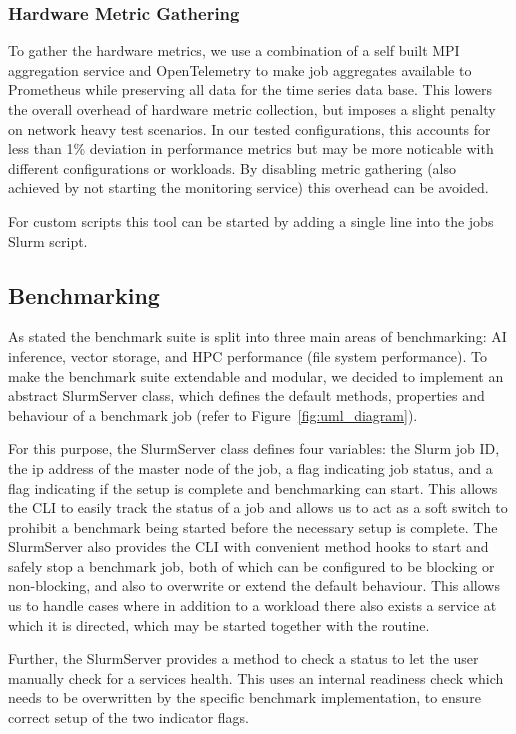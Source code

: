 \documentclass[conference,12pt]{IEEEtran}
\begin{document}
    \subsubsection{Hardware Metric Gathering}

    To gather the hardware metrics, we use a combination of a self built MPI aggregation service and OpenTelemetry to make job aggregates available to Prometheus while preserving all data for the time series data base.
    This lowers the overall overhead of hardware metric collection, but imposes a slight penalty on network heavy test scenarios.
    In our tested configurations, this accounts for less than 1\% deviation in performance metrics but may be more noticable with different configurations or workloads.
    By disabling metric gathering (also achieved by not starting the monitoring service) this overhead can be avoided.

    For custom scripts this tool can be started by adding a single line into the jobs Slurm script.

    

    \subsection{Benchmarking}
    As stated the benchmark suite is split into three main areas of benchmarking: AI inference, vector storage, and HPC performance (file system performance).
    To make the benchmark suite extendable and modular, we decided to implement an abstract SlurmServer class, which defines the default methods, properties and behaviour of a benchmark job (refer to Figure~\ref{fig:uml_diagram}).

    For this purpose, the SlurmServer class defines four variables: the Slurm job ID, the ip address of the master node of the job, a flag indicating job status, and a flag indicating if the setup is complete and benchmarking can start.
    This allows the CLI to easily track the status of a job and allows us to act as a soft switch to prohibit a benchmark being started before the necessary setup is complete.
    The SlurmServer also provides the CLI with convenient method hooks to start and safely stop a benchmark job, both of which can be configured to be blocking or non-blocking, and also to overwrite or extend the default behaviour.
    This allows us to handle cases where in addition to a workload there also exists a service at which it is directed, which may be started together with the routine.

    Further, the SlurmServer provides a method to check a status to let the user manually check for a services health. This uses an internal readiness check which needs to be overwritten by the specific benchmark implementation, to ensure correct setup of the two indicator flags.
\end{document}
